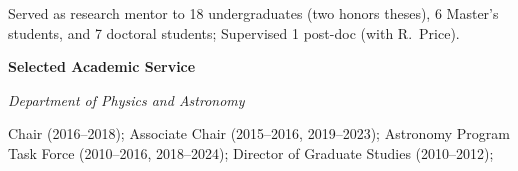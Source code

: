 \documentclass[11pt]{article}
\newcommand{\shead}[1]{\vspace{12.5pt}\centerline{{\bf{#1}}}}
\begin{document}
\begin{list}{\mbox{}}{%
\setlength{\partopsep}{0.0in}%
\setlength{\itemindent}{-0.5in}%
\setlength{\leftmargin}{1.0in}%
\setlength{\textwidth}{6.0in}
\setlength{\parsep}{-2.75pt}
}
\vspace{-16.5pt}
\item
Served as research mentor to 18 undergraduates (two honors theses), 6
Master's students, and 7 doctoral students; Supervised 1 post-doc
(with R.\ Price).

\end{list}

\vspace{-11pt}
\shead{Selected Academic Service}

\vspace{5.5pt}
\centerline{\em Department of Physics and Astronomy}

\begin{list}{\mbox{}}{%
\setlength{\partopsep}{0.0in}%
\setlength{\itemindent}{0in}%
\setlength{\leftmargin}{0.5in}%
\setlength{\parsep}{-2.75pt}
}
\vspace{-16.5pt}
\item
Chair (2016--2018); 
Associate Chair (2015--2016, 2019--2023); 
Astronomy Program Task Force  (2010--2016, 2018--2024);
Director of Graduate Studies (2010--2012); %
\end{list}
\end{document}
